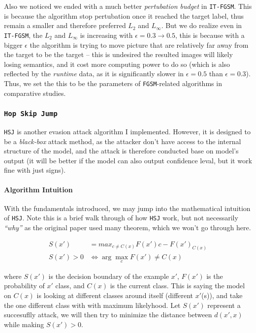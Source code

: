 \documentclass[11pt]{article}
\newcommand{\ilc}{\texttt}
\begin{document}
Also we noticed we ended with a much better \textit{pertubation budget} in \ilc{IT-FGSM}. This is because the algorithm stop pertubation once it reached the target label, thus remain a smaller and therefore preferred $L_2$ and $L_\infty$. But we do realize even in \ilc{IT-FGSM}, the $L_2$ and $L_\infty$ is increasing with $\epsilon = 0.3 \rightarrow 0.5$, this is because with a bigger $\epsilon$ the algorithm is trying to move picture that are relatively far away from the target to be the target -- this is undesired the resulted images will likely losing semantics, and it cost more computing power to do so (which is also reflected by the \textit{runtime} data, as it is significantly slower in $\epsilon = 0.5$ than $\epsilon = 0.3$). Thus, we set the this to be the parameters of \ilc{FGSM}-related algorithms in comparative studies.



\subsubsection{\ilc{Hop Skip Jump}}

\ilc{HSJ}\cite{cite:hsj_paper} is another evasion attack algorithm I implemented. However, it is designed to be a \textit{black-box} attack method, as the attacker don't have access to the internal structure of the model, and the attack is therefore conducted base on model's output (it will be better if the model can also output confidence leval, but it work fine with just signs).

\paragraph{Algorithm Intuition}

With the fundamentals introduced, we may jump into the mathematical intuition of \ilc{HSJ}. Note this is a brief walk through of how \ilc{HSJ} work, but not necessarily \textit{``why''} as the original paper used many theorem, which we won't go through here.

\begin{align}
    S(x') &= max_{c \neq C(x)}{F(x')c - F(x')_{C(x)}} \\ \nonumber
    S(x') > 0 &\Leftrightarrow \arg \max_c F(x') \neq C(x)
    \label{hsj_s_eq}
\end{align}

where $S(x')$ is the decision boundary of the example $x'$, $F(x')$ is the probability of $x'$ class, and $C(x)$ is the current class. This is saying the model on $C(x)$ is looking at different classes around itself (different $x'$(s)), and take the one different class with with maximum likelyhood. Let $S(x')$ represent a succesuflly attack, we will then try to minimize the distance between $d(x', x)$ while making $S(x') > 0$.
\end{document}
